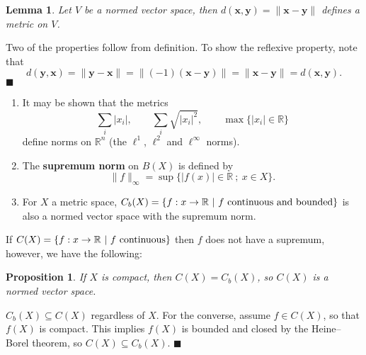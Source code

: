 \documentclass[letter-paper]{tufte-book}
\newtheorem{lemma}[theorem]{\color{pastel-blue}Lemma}
\newtheorem{proposition}[theorem]{\color{pastel-blue}Proposition}
\newenvironment{proof}[1][Proof]{\begin{trivlist}
\item[\hskip \labelsep {\bfseries #1}]}{\end{trivlist}}
\newenvironment{example}[1][Example]{\begin{trivlist}
\item[\hskip \labelsep {\bfseries #1}]}{\end{trivlist}}
\newcommand{\xb}{\boldsymbol{x}}
\newcommand{\yb}{\boldsymbol{y}}
\newcommand{\qed}{\hfill$\blacksquare$}
\begin{document}
\begin{lemma}
  Let $V$ be a normed vector space, then $d(\xb, \yb) = \|\xb - \yb\|$ defines a
  metric on $V$.
\end{lemma}

\begin{proof}
  Two of the properties follow from definition. To show the reflexive property,
  note that
  \begin{equation*}
    d(\yb, \xb) = \| \yb - \xb \| = \| (-1)(\xb - \yb)\| = 
    \| \xb - \yb \| = d(\xb, \yb).
  \end{equation*}
  \qed
\end{proof}

\begin{example}
  \begin{enumerate}
    \item It may be shown that the metrics
    \begin{equation*}
      \sum_i |x_i|, \qquad \sum_i \sqrt{|x_i|^2}, \qquad
      \max \{|x_i| \in \mathbb{R}\}
    \end{equation*}
    define norms on $\mathbb{R}^n$ (the $\ell^1$, $\ell^2$ and $\ell^\infty$
    norms).
    
    \item The \textbf{supremum norm} on $B(X)$ is defined by
    \begin{equation*}
      \|f\|_{\infty} = \sup\{ |f(x)|\in \mathbb{R}\ ;\ x\in X\}.
    \end{equation*}
    
    \item For $X$ a metric space, $C_b (X) = \{f : x \to \mathbb{R}\ |\ f\
    \textnormal{continuous and bounded}\}$ is also a normed vector space with
    the supremum norm.
  \end{enumerate}
\end{example}

If $C(X) = \{f : x \to \mathbb{R}\ |\ f\ \textnormal{continuous}\}$ then $f$
does not have a supremum, however, we have the following:
\begin{proposition}
  If $X$ is compact, then $C(X) = C_b(X)$, so $C(X)$ is a normed vector space.
\end{proposition}

\begin{proof}
  $C_b(X) \subseteq C(X)$ regardless of $X$. For the converse, assume $f \in
  C(X)$, so that $f(X)$ is compact. This implies $f(X)$ is bounded and closed by
  the Heine--Borel theorem, so $C(X) \subseteq C_b(X)$. \qed
\end{proof}
\end{document}
